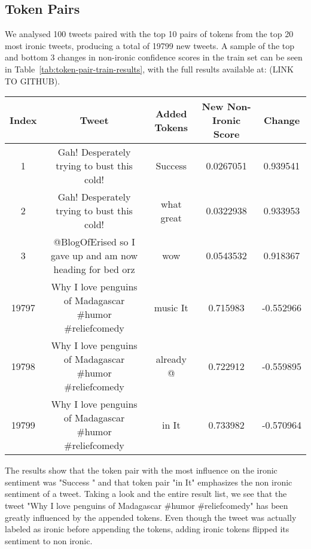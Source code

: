 \documentclass[10pt, a4paper]{article}
\begin{document}
\subsection{Token Pairs}

We analysed 100 tweets paired with the top 10 pairs of tokens from the top 20 most ironic tweets, producing a total of 19799 new tweets. A sample of the top and bottom 3 changes in non-ironic confidence scores in the train set can be seen in Table~\ref{tab:token-pair-train-results}, with the full results available at: (LINK TO GITHUB).

\begin{table*}
\caption{Sample of Token Pair Results on the Train Set}
\label{tab:token-pair-train-results}
\begin{center}
\begin{tabular}{c|c|c|c|c}
\toprule
Index & Tweet & Added Tokens & New Non-Ironic Score & Change\\
\midrule
1     & Gah! Desperately trying to bust this cold!                & Success \textvisiblespace & 0.0267051 & 0.939541  \\
2     & Gah! Desperately trying to bust this cold!                & what great                & 0.0322938 & 0.933953  \\
3     & @BlogOfErised so I gave up and am now heading for bed orz & wow \textvisiblespace     & 0.0543532 & 0.918367  \\
19797 & Why I love penguins of Madagascar \#humor \#reliefcomedy  & music It                  & 0.715983  & -0.552966 \\
19798 & Why I love penguins of Madagascar \#humor \#reliefcomedy  & already @                 & 0.722912  & -0.559895 \\
19799 & Why I love penguins of Madagascar \#humor \#reliefcomedy  & in It                     & 0.733982  & -0.570964 \\
\bottomrule
\end{tabular}
\end{center}
\end{table*}

The results show that the token pair with the most influence on the ironic sentiment was "Success \textvisiblespace " and that token pair "in It" emphasizes the non ironic sentiment of a tweet.
Taking a look and the entire result list, we see that the tweet "Why I love penguins of Madagascar  #humor #reliefcomedy" has been greatly influenced by the appended tokens.
Even though the tweet was actually labeled as ironic before appending the tokens, adding ironic tokens flipped its sentiment to non ironic.
\end{document}
